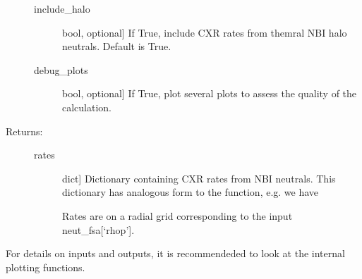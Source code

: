 \documentclass[letterpaper,10pt,english]{sphinxmanual}
\begin{document}
\begin{fulllineitems}
\begin{description}
\begin{description}
\item[{include\_halo}] \leavevmode{[}bool, optional{]}
If True, include CXR rates from themral NBI halo neutrals. Default is True.

\item[{debug\_plots}] \leavevmode{[}bool, optional{]}
If True, plot several plots to assess the quality of the calculation.

\end{description}

\item[{Returns:}] \leavevmode\begin{description}
\item[{rates}] \leavevmode{[}dict{]}
Dictionary containing CXR rates from NBI neutrals. This dictionary has analogous form to the 
{\hyperref[\detokenize{aurora:aurora.nbi_neutrals.get_neutrals_fsa}]{}} function, e.g. we have

\begin{sphinxVerbatim}[commandchars=\\\{\}]
\PYG{p}{[}\PYG{p}{]}\PYG{p}{[}\PYG{p}{]}\PYG{p}{[}\PYG{p}{]}
\end{sphinxVerbatim}

Rates are on a radial grid corresponding to the input neut\_fsa{[}‘rhop’{]}.

\end{description}

\end{description}

For details on inputs and outputs, it is recommendeded to look at the internal plotting functions.

\end{fulllineitems}


\begin{fulllineitems}
\label{\detokenize{aurora:aurora.nbi_neutrals.get_ls_cycle}}
\end{fulllineitems}
\end{document}
